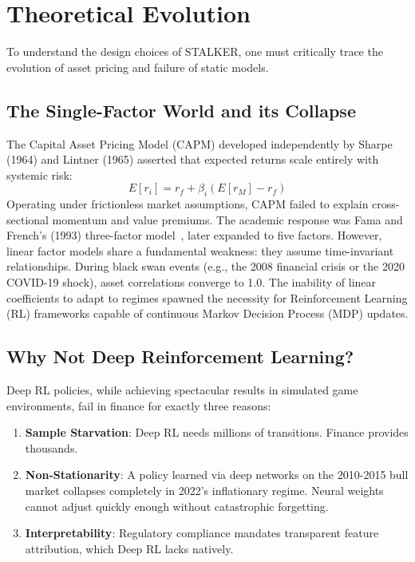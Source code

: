 \documentclass[journal,10pt,twocolumn]{IEEEtran}
\begin{document}
\section{Theoretical Evolution}
\label{sec:theory}

To understand the design choices of STALKER, one must critically trace the evolution of asset pricing and failure of static models.

\subsection{The Single-Factor World and its Collapse}
The Capital Asset Pricing Model (CAPM) developed independently by Sharpe (1964) and Lintner (1965) asserted that expected returns scale entirely with systemic risk:
\begin{equation}
E[r_i] = r_f + \beta_i \left( E[r_M] - r_f \right)
\end{equation}
Operating under frictionless market assumptions, CAPM failed to explain cross-sectional momentum and value premiums. The academic response was Fama and French's (1993) three-factor model~\cite{fama1993common}, later expanded to five factors. However, linear factor models share a fundamental weakness: they assume time-invariant relationships. During black swan events (e.g., the 2008 financial crisis or the 2020 COVID-19 shock), asset correlations converge to 1.0. The inability of linear coefficients to adapt to regimes spawned the necessity for Reinforcement Learning (RL) frameworks capable of continuous Markov Decision Process (MDP) updates.

\subsection{Why Not Deep Reinforcement Learning?}
Deep RL policies, while achieving spectacular results in simulated game environments, fail in finance for exactly three reasons:
\begin{enumerate}
    \item \textbf{Sample Starvation}: Deep RL needs millions of transitions. Finance provides thousands. 
    \item \textbf{Non-Stationarity}: A policy learned via deep networks on the 2010-2015 bull market collapses completely in 2022's inflationary regime. Neural weights cannot adjust quickly enough without catastrophic forgetting.
    \item \textbf{Interpretability}: Regulatory compliance mandates transparent feature attribution, which Deep RL lacks natively.
\end{enumerate}
\end{document}
